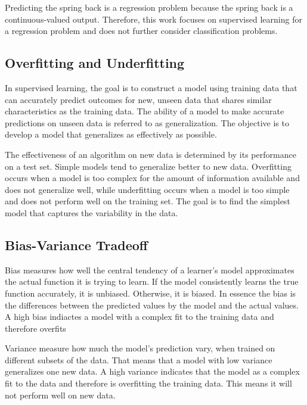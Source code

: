 Predicting the spring back is a regression problem because the spring back is a continuous-valued
output.
Therefore, this work focuses on supervised learning for a regression problem and does not further
consider classification problems.

\subsection{Overfitting and Underfitting}\label{subsec:overfitting-and-underfitting}
In supervised learning, the goal is to construct a model using training data that can accurately
predict outcomes for new, unseen data that shares similar characteristics as the training data.
The ability of a model to make accurate predictions on unseen data is referred to as
generalization. The objective is to develop a model that generalizes as effectively as possible.
\cite[p. 35]{muller_introductionmachinelearning_2016}

The effectiveness of an algorithm on new data is determined by its performance on a test set.
Simple models tend to generalize better to new data. Overfitting occurs when a model is too
complex for the amount of information available and does not generalize well, while underfitting
occurs when a model is too simple and does not perform well on the training set. The goal is to
find the simplest model that captures the variability in the data.
\cite[p. 35]{muller_introductionmachinelearning_2016}

\subsection{Bias-Variance Tradeoff}\label{subsec:bias-variance-tradeoff}
Bias measures how well the central tendency of a learner's model approximates the actual function
it is trying to learn. If the model consistently learns the true function accurately, it is
unbiased. Otherwise, it is biased. \cite[p. 7-8]{neal_biasvariancetradeofftextbooks_2019}
In essence the bias is the differences between the predicted values by the model and the actual
values.
A high bias indiactes a model with a complex fit to the training data and therefore overfits
\cite[p. 20]{neal_biasvariancetradeofftextbooks_2019}

Variance measure how much the model's prediction vary, when trained on different subsets of the
data. That means that a model with low variance generalizes one new data. A high variance
indicates that the model as a complex fit to the data and therefore is overfitting the training
data. This means it will not perform well on new data. \cite[p.
7-8]{neal_biasvariancetradeofftextbooks_2019}

